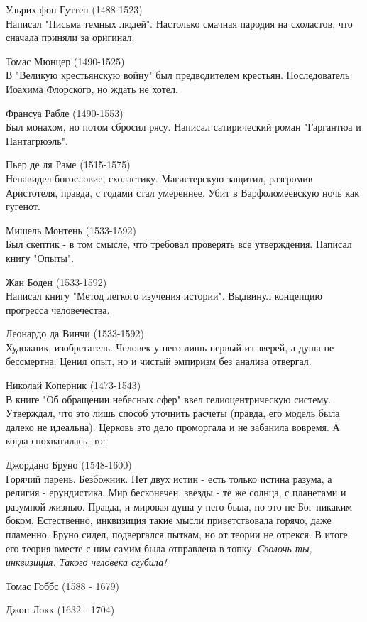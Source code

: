 Ульрих фон Гуттен (1488-1523)\\
Написал "Письма темных людей". Настолько смачная пародия на схоластов, что сначала приняли за оригинал.

Томас Мюнцер (1490-1525)\\
В "Великую крестьянскую войну" был предводителем крестьян. Последователь \underline{Иоахима Флорского}, но ждать не хотел.

Франсуа Рабле (1490-1553)\\
Был монахом, но потом сбросил рясу. Написал сатирический роман "Гаргантюа и Пантагрюэль".

Пьер де ля Раме (1515-1575)\\
Ненавидел богословие, схоластику. Магистерскую защитил, разгромив Аристотеля, правда, с годами стал умереннее. Убит в Варфоломеевскую ночь как гугенот.

Мишель Монтень (1533-1592)\\
Был скептик - в том смысле, что требовал проверять все утверждения. Написал книгу "Опыты".

Жан Боден (1533-1592)\\Написал книгу "Метод легкого изучения истории". Выдвинул концепцию прогресса человечества.

Леонардо да Винчи (1533-1592)\\
Художник, изобретатель. Человек у него лишь первый из зверей, а душа не бессмертна. Ценил опыт, но и чистый эмпиризм без анализа отвергал.

Николай Коперник (1473-1543)\\
В книге "Об обращении небесных сфер" ввел гелиоцентрическую систему. Утверждал, что это лишь способ уточнить расчеты (правда, его модель была далеко не идеальна). Церковь это дело проморгала и не забанила вовремя. А когда спохватилась, то:

Джордано Бруно (1548-1600)\\
Горячий парень. Безбожник. Нет двух истин - есть только истина разума, а религия - ерундистика. Мир бесконечен, звезды - те же солнца, с планетами и разумной жизнью. Правда, и мировая душа у него была, но это не Бог никаким боком. Естественно, инквизиция такие мысли приветствовала горячо, даже пламенно. Бруно сидел, подвергался пыткам, но от теории не отрекся. В итоге его теория вместе с ним самим была отправлена в топку. \textit{Сволочь ты, инквизиция. Такого человека сгубила!}

Томас Гоббс (1588 - 1679)

Джон Локк (1632 - 1704)

